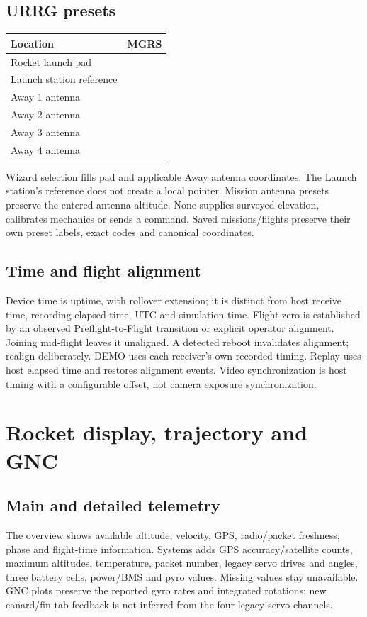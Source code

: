 \subsection{URRG presets}
\begin{longtable}{@{}L{.38\linewidth}L{.55\linewidth}@{}}
\toprule Location & MGRS \\\midrule\endhead
Rocket launch pad &  \\
Launch station reference &  \\
Away 1 antenna &  \\
Away 2 antenna &  \\
Away 3 antenna &  \\
Away 4 antenna &  \\
\bottomrule
\end{longtable}
Wizard selection fills pad and applicable Away antenna coordinates. The
Launch station's reference does not create a local pointer. Mission antenna
presets preserve the entered antenna altitude. None supplies surveyed elevation,
calibrates mechanics or sends a command. Saved missions/flights preserve their
own preset labels, exact codes and canonical coordinates.

\subsection{Time and flight alignment}
Device time is uptime, with rollover extension; it is distinct from host receive
time, recording elapsed time, UTC and simulation time. Flight zero is established
by an observed Preflight-to-Flight transition or explicit operator alignment.
Joining mid-flight leaves it unaligned. A detected reboot invalidates alignment;
realign deliberately. DEMO uses each receiver's own recorded timing. Replay
uses host elapsed time and restores alignment events. Video synchronization is
host timing with a configurable offset, not camera exposure synchronization.

\section{Rocket display, trajectory and GNC}\label{sec:flightview}
\subsection{Main and detailed telemetry}
The overview shows available altitude, velocity, GPS, radio/packet freshness,
phase and flight-time information. Systems adds GPS accuracy/satellite counts,
maximum altitudes, temperature, packet number, legacy servo drives and angles,
three battery cells, power/BMS and pyro values. Missing values stay unavailable.
GNC plots preserve the reported gyro rates and integrated rotations; new
canard/fin-tab feedback is not inferred from the four legacy servo channels.

